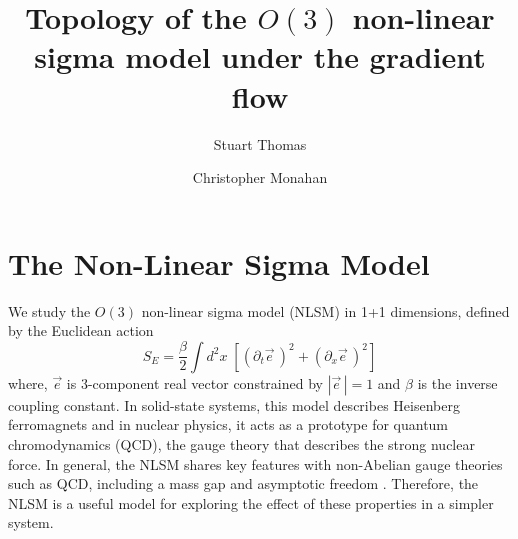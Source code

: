 \documentclass[a4paper,11pt]{article}
\title{Topology of the $O(3)$ non-linear sigma model under the gradient flow}
\author*[a]{Stuart Thomas}
\author[a]{Christopher Monahan}
\affiliation[a]{Department of Physics, William \& Mary,  Williamsburg, Virginia 23187, USA}
\newcommand{\e}{\vec e}
\begin{document}
\maketitle


\section{The Non-Linear Sigma Model}
We study the $O(3)$ non-linear sigma model (NLSM) in 1+1 dimensions, defined by the Euclidean action
\begin{equation*}
    \label{eq:nlsm euclidean action}
    S_E = \frac{\beta}{2} \int d^2x \; \left[ \left(\partial_t \e\, \right)^2+ \left( \partial_x \e\,\right)^2 \right]
\end{equation*}
where, $\e$ is 3-component real vector constrained by $|\e\,|=1$ and $\beta$ is the inverse coupling constant. In solid-state systems, this model describes Heisenberg ferromagnets \cite{callan1985} and in nuclear physics, it acts as a prototype for quantum chromodynamics (QCD), the gauge theory that describes the strong nuclear force. In general, the NLSM shares key features with non-Abelian gauge theories such as QCD, including a mass gap and asymptotic freedom \cite{polyakov1975}. Therefore, the NLSM is a useful model for exploring the effect of these properties in a simpler system.
\end{document}
